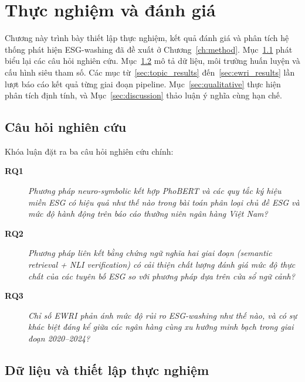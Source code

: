 \chapter{Thực nghiệm và đánh giá}
\label{ch:experiment}

Chương này trình bày thiết lập thực nghiệm, kết quả đánh giá và phân tích hệ thống phát hiện ESG-washing đã đề xuất ở Chương~\ref{ch:method}. Mục~\ref{sec:research_questions} phát biểu lại các câu hỏi nghiên cứu. Mục~\ref{sec:exp_setup} mô tả dữ liệu, môi trường huấn luyện và cấu hình siêu tham số. Các mục từ~\ref{sec:topic_results} đến~\ref{sec:ewri_results} lần lượt báo cáo kết quả từng giai đoạn pipeline. Mục~\ref{sec:qualitative} thực hiện phân tích định tính, và Mục~\ref{sec:discussion} thảo luận ý nghĩa cùng hạn chế.


\section{Câu hỏi nghiên cứu}
\label{sec:research_questions}

Khóa luận đặt ra ba câu hỏi nghiên cứu chính:

\begin{description}
    \item[\textbf{RQ1}] \textit{Phương pháp neuro-symbolic kết hợp PhoBERT và các quy tắc ký hiệu miền ESG có hiệu quả như thế nào trong bài toán phân loại chủ đề ESG và mức độ hành động trên báo cáo thường niên ngân hàng Việt Nam?}
    \item[\textbf{RQ2}] \textit{Phương pháp liên kết bằng chứng ngữ nghĩa hai giai đoạn (semantic retrieval + NLI verification) có cải thiện chất lượng đánh giá mức độ thực chất của các tuyên bố ESG so với phương pháp dựa trên cửa sổ ngữ cảnh?}
    \item[\textbf{RQ3}] \textit{Chỉ số EWRI phản ánh mức độ rủi ro ESG-washing như thế nào, và có sự khác biệt đáng kể giữa các ngân hàng cùng xu hướng minh bạch trong giai đoạn 2020--2024?}
\end{description}


\section{Dữ liệu và thiết lập thực nghiệm}
\label{sec:exp_setup}

